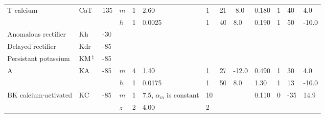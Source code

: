 \documentclass[12pt]{article}
\begin{document}
\begin{table}[h]
\begin{tabular}{ l l l l l l l l l l l l l }
   T calcium                         & CaT                                                                 & 135      & $m$              & 1      & 2.60                                             & 1      & 21    & -8.0   & 0.180     & 1     & 40     & 4.0     \\
                                             &                                                                          &              & $h$               & 1      & 0.0025                                        & 1      & 40    & 8.0     & 0.190    & 1      & 50    & -10.0  \\
   Anomalous rectifier       & Kh\,\cite{Spain-W-J:1987ij}                         & -30       &                       &         &                                                      &         &          &           &                &         &          &            \\
   Delayed rectifier            & Kdr\,\cite{Yamada-W:1989bs}                    & -85       &                       &         &                                                      &         &          &           &                &         &          &            \\
   Persistant potassium    & KM\,$^\ddag$\,\cite{Yamada-W:1989bs} & -85       &                       &         &                                                      &         &          &           &                &         &          &            \\
   A                                       & KA                                                                   & -85       & $m$              & 4      & 1.40                                             & 1      & 27    & -12.0  & 0.490    & 1      & 30    & 4.0     \\
                                             &                                                                         &              & $h$               & 1      & 0.0175                                        & 1      & 50    & 8.0    & 1.30       & 1      & 13    & -10.0  \\
   BK calcium-activated    & KC                                                                  & -85       & $m$               & 1      & 7.5, $\alpha_m$ is constant   & 10    &          &           & 0.110    & 0      & -35   & 14.9   \\
                                             &                                                                         &              & $z$                & 2      & 4.00                                            & 2      &          &           &                &         &          &            \\

\end{tabular}
\end{table}
\end{document}
